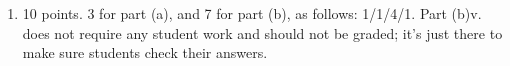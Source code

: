 \documentclass{article}
\begin{document}
\begin{enumerate}



\item 

\begin{grading}
10 points. 3 for part (a), and 7 for part (b), as follows: 1/1/4/1. Part (b)v. does not require any student work and should not be graded; it's just there to make sure students check their answers.
\end{grading}

\begin{enumerate}







\end{enumerate}
\end{enumerate}
\end{document}
